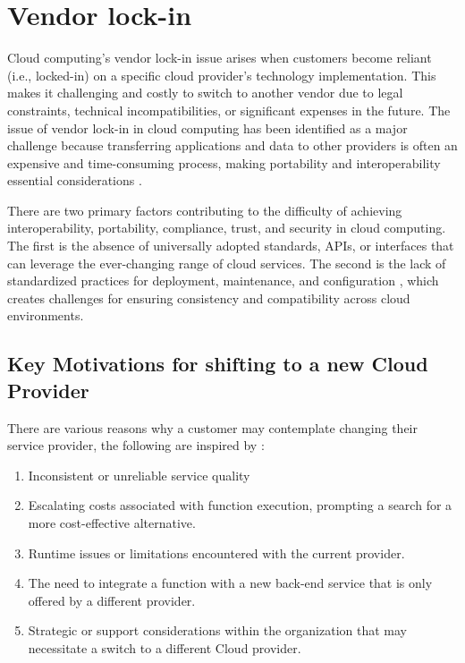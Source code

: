 \chapter{Vendor lock-in}
\label{chap:vendor-lock-in}

Cloud computing's vendor lock-in issue arises when customers become reliant (i.e., locked-in) on a specific cloud provider's technology implementation. This makes it challenging and costly to switch to another vendor due to legal constraints, technical incompatibilities, or significant expenses in the future. The issue of vendor lock-in in \gls{cloud computing} has been identified as a major challenge because transferring applications and data to other providers is often an expensive and time-consuming process, making portability and interoperability essential considerations \cite{guest_2013_oracle}.

There are two primary factors contributing to the difficulty of achieving interoperability, portability, compliance, trust, and security in cloud computing. The first is the absence of universally adopted standards, APIs, or interfaces that can leverage the ever-changing range of cloud services. The second is the lack of standardized practices for deployment, maintenance, and configuration \cite{oparamartins_2014_critical}, which creates challenges for ensuring consistency and compatibility across cloud environments. 

\section{Key Motivations for shifting to a new Cloud Provider}
There are various reasons why a customer may contemplate changing their service provider, the following are inspired by \cite{oparamartins_2014_critical}:

\begin{enumerate}
    \item Inconsistent or unreliable service quality
    \item Escalating costs associated with function execution, prompting a search for a more cost-effective alternative.
    \item Runtime issues or limitations encountered with the current provider.
    \item The need to integrate a function with a new back-end service that is only offered by a different provider.
    \item Strategic or support considerations within the organization that may necessitate a switch to a different Cloud provider.
\end{enumerate}

